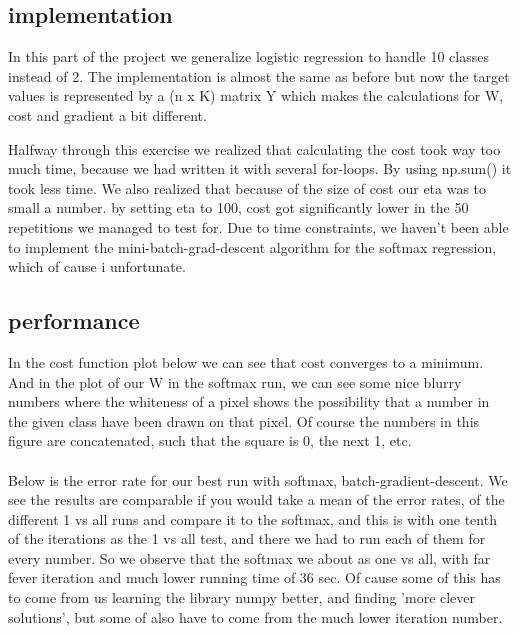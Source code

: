 \documentclass[paper=a4, fontsize=11pt]{scrartcl} %
\numberwithin{equation}{section} %
\numberwithin{figure}{section} %
\numberwithin{table}{section} %
\begin{document}
\subsection{implementation}
In this part of the project we generalize logistic regression to handle 10 classes instead of 2. The implementation is almost the same as before but now the target values is represented by a (n x K) matrix Y which makes the calculations for W, cost and gradient a bit different.

Halfway through this exercise we realized that calculating the cost took way too much time, because we had written it with several for-loops. By using np.sum() it took less time. 
We also realized that because of the size of cost our eta was to small a number. by setting eta to 100, cost got significantly lower in the 50 repetitions we managed to test for.
Due to time constraints, we haven't been able to implement the mini-batch-grad-descent algorithm for the softmax regression, which of cause i unfortunate.

\subsection{performance}
In the cost function plot below we can see that cost converges to a minimum. And in the plot of our W in the softmax run, we can see some nice blurry numbers where the whiteness of a pixel shows the possibility that a number in the given class have been drawn on that pixel. Of course the numbers in this figure are concatenated, such that the square is 0, the next 1, etc. 
\\ \\
Below is the error rate for our best run with softmax, batch-gradient-descent. We see the results are comparable if you would take a mean of the error rates, of the different 1 vs all runs and compare it to the softmax, and this is with one tenth of the iterations as the 1 vs all test, and there we had to run each of them for every number. So we observe that the softmax we about as one vs all, with far fever iteration and much lower running time of 36 sec. Of cause some of this has to come from us learning the library numpy better, and finding 'more clever solutions', but some of also have to come from the much lower iteration number.

\begin{figure}[!htb]
\end{figure}
\end{document}
